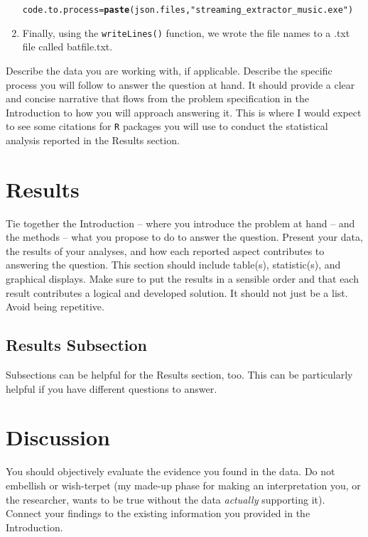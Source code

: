 \documentclass{article}\usepackage[]{graphicx}\usepackage[]{xcolor}
\makeatletter
\newcommand{\hlsng}[1]{\textcolor[rgb]{0.192,0.494,0.8}{#1}}%
\newcommand{\hldef}[1]{\textcolor[rgb]{0.345,0.345,0.345}{#1}}%
\newcommand{\hlkwb}[1]{\textcolor[rgb]{0.69,0.353,0.396}{#1}}%
\newcommand{\hlkwd}[1]{\textcolor[rgb]{0.737,0.353,0.396}{\textbf{#1}}}%
\newenvironment{kframe}{%
 \def\at@end@of@kframe{}%
 \ifinner\ifhmode%
  \def\at@end@of@kframe{\end{minipage}}%
  \begin{minipage}{\columnwidth}%
 \fi\fi%
 \def\FrameCommand##1{\hskip\@totalleftmargin \hskip-\fboxsep
 \colorbox{shadecolor}{##1}\hskip-\fboxsep
     \hskip-\linewidth \hskip-\@totalleftmargin \hskip\columnwidth}%
 \MakeFramed {\advance\hsize-\width
   \@totalleftmargin\z@ \linewidth\hsize
   \@setminipage}}%
 {\par\unskip\endMakeFramed%
 \at@end@of@kframe}
\newenvironment{knitrout}{}{} %
\makeatother
\begin{document}
\begin{multicols}{2}
\begin{enumerate}[1.]
\begin{knitrout}
\begin{kframe}
\begin{alltt}
\hldef{code.to.process} \hlkwb{=} \hlkwd{paste}\hldef{(json.files,} \hlsng{"streaming_extractor_music.exe"}\hldef{)}
\end{alltt}
\end{kframe}
\end{knitrout}

\item Finally, using the \texttt{writeLines()} function, we wrote the file names to a .txt file called batfile.txt.
\end{enumerate}




Describe the data you are working with, if applicable. Describe the specific process you will follow to answer the question at hand. It should provide a clear and concise narrative that flows from the problem specification in the Introduction to how you will approach answering it. This is where I would expect to see some citations for \texttt{R} packages you will use to conduct the statistical analysis reported in the Results section.



\section{Results}
Tie together the Introduction -- where you introduce the problem at hand -- and the methods --  what you propose to do to answer the question. Present your data, the results of your analyses, and how each reported aspect contributes to answering the question. This section should include table(s), statistic(s), and graphical displays. Make sure to put the results in a sensible order and that each result contributes a logical and developed solution. It should not just be a list. Avoid being repetitive. 

\subsection{Results Subsection}
Subsections can be helpful for the Results section, too. This can be particularly helpful if you have different questions to answer. 


\section{Discussion}
 You should objectively evaluate the evidence you found in the data. Do not embellish or wish-terpet (my made-up phase for making an interpretation you, or the researcher, wants to be true without the data \emph{actually} supporting it). Connect your findings to the existing information you provided in the Introduction.


\end{multicols}
\end{document}
